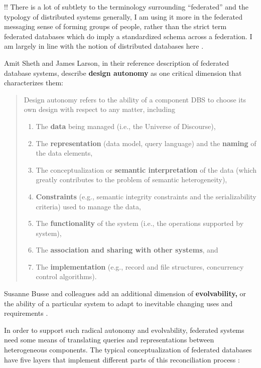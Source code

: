 \documentclass[10pt]{article}
\begin{document}
\begin{multicols}{2}
!! There is a lot of subtlety to the terminology surrounding
``federated'' and the typology of distributed systems generally, I am
using it more in the federated messaging sense of forming groups of
people, rather than the strict term federated databases which do imply a
standardized schema across a federation. I am largely in line with the
notion of distributed databases here \cite{hankeDefenseDecentralizedResearch2021} .

Amit Sheth and James Larson, in their reference description of federated
database systems, describe \textbf{design autonomy} as one critical
dimension that characterizes them:

\begin{quote}
Design autonomy refers to the ability of a component DBS to choose its
own design with respect to any matter, including

\begin{enumerate}
\def\labelenumi{(\alph{enumi})}
\item
  The \textbf{data} being managed (i.e., the Universe of Discourse),
\item
  The \textbf{representation} (data model, query language) and the
  \textbf{naming} of the data elements,
\item
  The conceptualization or \textbf{semantic interpretation} of the data
  (which greatly contributes to the problem of semantic heterogeneity),
\item
  \textbf{Constraints} (e.g., semantic integrity constraints and the
  serializability criteria) used to manage the data,
\item
  The \textbf{functionality} of the system (i.e., the operations
  supported by system),
\item
  The \textbf{association and sharing with other systems}, and
\item
  The \textbf{implementation} (e.g., record and file structures,
  concurrency control algorithms).
\end{enumerate}
\end{quote}

Susanne Busse and colleagues add an additional dimension of
\textbf{evolvability,} or the ability of a particular system to adapt to
inevitable changing uses and requirements \cite{busseFederatedInformationSystems1999} .

In order to support such radical autonomy and evolvability, federated
systems need some means of translating queries and representations
between heterogeneous components. The typical conceptualization of
federated databases have five layers that implement different parts of
this reconciliation process \cite{shethFederatedDatabaseSystems1990} :


\end{multicols}
\end{document}
